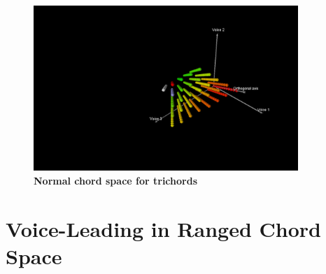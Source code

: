 \documentclass[14pt,letterpaper,onecolumn]{scrartcl}
\begin{document}
\begin{itemize}
\begin{description}
\begin{figure}[!htp]
	\centering
		\includegraphics[trim=565 220 100 110,width=10cm,clip]{normalchordspace} 
	\caption{\textbf{Normal chord space for trichords}}
	\label{fig:normalchordspace}
\end{figure}

\end{description}

\end{itemize}

\section{Voice-Leading in Ranged Chord Space}
\end{document}
